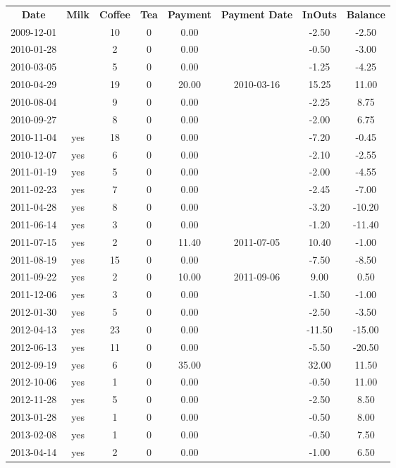 \begin{center}
\begin{tabular}{cccccccc}
\textbf{Date} & \textbf{Milk} & \textbf{Coffee} & \textbf{Tea} & \textbf{Payment} & \textbf{Payment Date} & \textbf{InOuts} & \textbf{Balance} \\
2009-12-01 &  & 10 & 0 &  0.00 &  &  -2.50 &  -2.50\\ 
2010-01-28 &  &  2 & 0 &  0.00 &  &  -0.50 &  -3.00\\ 
2010-03-05 &  &  5 & 0 &  0.00 &  &  -1.25 &  -4.25\\ 
2010-04-29 &  & 19 & 0 & 20.00 & 2010-03-16 &  15.25 &  11.00\\ 
2010-08-04 &  &  9 & 0 &  0.00 &  &  -2.25 &   8.75\\ 
2010-09-27 &  &  8 & 0 &  0.00 &  &  -2.00 &   6.75\\ 
2010-11-04 & yes & 18 & 0 &  0.00 &  &  -7.20 &  -0.45\\ 
2010-12-07 & yes &  6 & 0 &  0.00 &  &  -2.10 &  -2.55\\ 
2011-01-19 & yes &  5 & 0 &  0.00 &  &  -2.00 &  -4.55\\ 
2011-02-23 & yes &  7 & 0 &  0.00 &  &  -2.45 &  -7.00\\ 
2011-04-28 & yes &  8 & 0 &  0.00 &  &  -3.20 & -10.20\\ 
2011-06-14 & yes &  3 & 0 &  0.00 &  &  -1.20 & -11.40\\ 
2011-07-15 & yes &  2 & 0 & 11.40 & 2011-07-05 &  10.40 &  -1.00\\ 
2011-08-19 & yes & 15 & 0 &  0.00 &  &  -7.50 &  -8.50\\ 
2011-09-22 & yes &  2 & 0 & 10.00 & 2011-09-06 &   9.00 &   0.50\\ 
2011-12-06 & yes &  3 & 0 &  0.00 &  &  -1.50 &  -1.00\\ 
2012-01-30 & yes &  5 & 0 &  0.00 &  &  -2.50 &  -3.50\\ 
2012-04-13 & yes & 23 & 0 &  0.00 &  & -11.50 & -15.00\\ 
2012-06-13 & yes & 11 & 0 &  0.00 &  &  -5.50 & -20.50\\ 
2012-09-19 & yes &  6 & 0 & 35.00 &  &  32.00 &  11.50\\ 
2012-10-06 & yes &  1 & 0 &  0.00 &  &  -0.50 &  11.00\\ 
2012-11-28 & yes &  5 & 0 &  0.00 &  &  -2.50 &   8.50\\ 
2013-01-28 & yes &  1 & 0 &  0.00 &  &  -0.50 &   8.00\\ 
2013-02-08 & yes &  1 & 0 &  0.00 &  &  -0.50 &   7.50\\ 
2013-04-14 & yes &  2 & 0 &  0.00 &  &  -1.00 &   6.50
\end{tabular}
\end{center}

